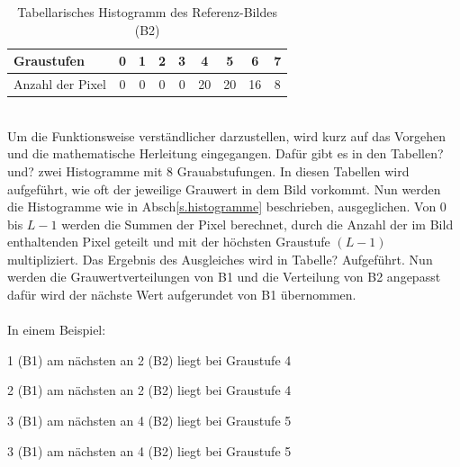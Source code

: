 \documentclass[a4paper,12pt,oneside]{article}
\begin{document}
  \begin{table}
  [h]
  \caption{Tabellarisches Histogramm des Referenz-Bildes (B2)}
  \centering
  \begin{tabular}{|l|c|c|c|c|c|c|c|c|}
  \hline
  Graustufen & 0 & 1 & 2 & 3 & 4 & 5 & 6 & 7\\
  \hline
  Anzahl der Pixel & 0 & 0 & 0 & 0 & 20 & 20 & 16 & 8\\
  \hline
  \end{tabular}
  \end{table}\\
  Um die Funktionsweise verständlicher darzustellen, wird kurz auf das Vorgehen und die mathematische Herleitung eingegangen. Dafür gibt es in den Tabellen?und? zwei Histogramme mit 8 Grauabstufungen. In diesen Tabellen wird aufgeführt, wie oft der jeweilige Grauwert in dem Bild vorkommt. Nun werden die Histogramme wie in Absch\ref{s.histogramme} beschrieben, ausgeglichen. Von 0 bis $L-1$ werden die Summen der Pixel berechnet, durch die Anzahl der im Bild enthaltenden Pixel geteilt und mit der höchsten Graustufe $(L-1)$ multipliziert. Das Ergebnis des Ausgleiches wird in Tabelle? Aufgeführt. Nun werden die Grauwertverteilungen von B1 und die Verteilung von B2 angepasst dafür wird der nächste Wert aufgerundet von B1 übernommen.\\\\
  In einem Beispiel:
  
  1 (B1) am nächsten an 2 (B2) liegt bei Graustufe 4
  
  2 (B1) am nächsten an 2 (B2) liegt bei Graustufe 4
  
  3 (B1) am nächsten an 4 (B2) liegt bei Graustufe 5
  
  3 (B1) am nächsten an 4 (B2) liegt bei Graustufe 5
  
\end{document}
